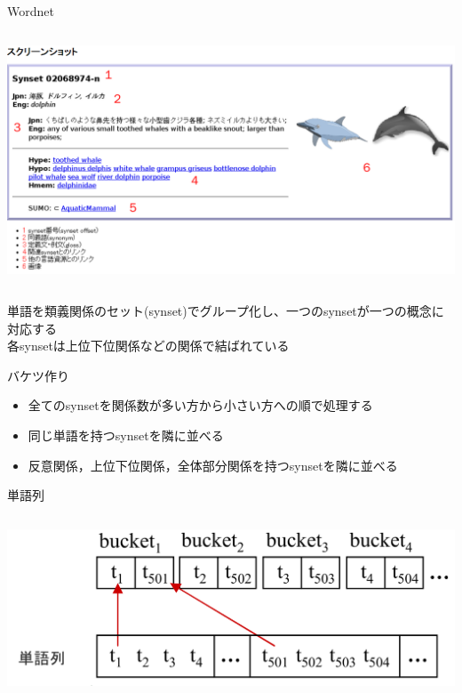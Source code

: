\documentclass[14pt,xcolor=dvipsnames,table,dvipdfmx]{beamer}
\begin{document}
\begin{frame}{Wordnet}
\fontsize{12pt}{7.2}\selectfont
	\begin{columns}[t]
		\begin{column}{1.0\textwidth} %
			\includegraphics[width=\columnwidth]{photo14.png}
		\end{column}
	\end{columns}
	\begin{block}{}
		単語を類義関係のセット(synset)でグループ化し、一つのsynsetが一つの概念に対応する \\
		各synsetは上位下位関係などの関係で結ばれている
	\end{block}
\end{frame}

\begin{frame}{バケツ作り}
	\begin{block}{}
		\begin{itemize}
			\item 全てのsynsetを関係数が多い方から小さい方への順で処理する
			\item 同じ単語を持つsynsetを隣に並べる
			\item 反意関係，上位下位関係，全体部分関係を持つsynsetを隣に並べる
		\end{itemize}
	\end{block}
\end{frame}

\begin{frame}{単語列}
	\begin{columns}[t]
		\begin{column}{1.0\textwidth} %
			\includegraphics[width=\columnwidth]{rk11.png}
		\end{column}
	\end{columns}
\end{frame}
\end{document}
